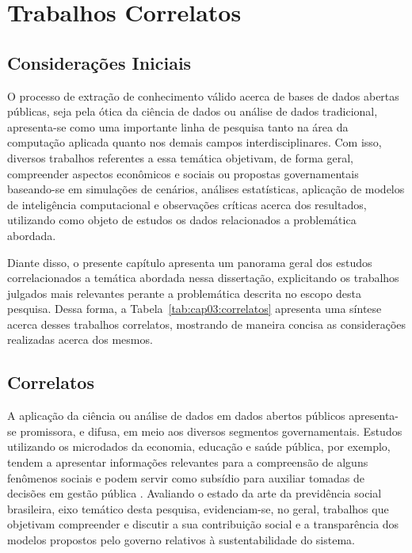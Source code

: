 \chapter{Trabalhos Correlatos}\label{cap:estArte}

\section{Considerações Iniciais}\label{sec:primTrab}

O processo de extração de conhecimento válido acerca de bases de dados abertas públicas, seja pela ótica da ciência de dados ou análise de dados tradicional, apresenta-se como uma importante linha de pesquisa tanto na área da computação aplicada quanto nos demais campos interdisciplinares. Com isso, diversos trabalhos referentes a essa temática objetivam, de forma geral, compreender aspectos econômicos e sociais ou propostas governamentais baseando-se em simulações de cenários, análises estatísticas, aplicação de modelos de inteligência computacional e observações críticas acerca dos resultados, utilizando como objeto de estudos os dados relacionados a problemática abordada. 

Diante disso, o presente capítulo apresenta um panorama geral dos estudos correlacionados a temática abordada nessa dissertação, explicitando os trabalhos julgados mais relevantes perante a problemática descrita no escopo desta pesquisa. Dessa forma, a Tabela~\ref{tab:cap03:correlatos} apresenta uma síntese acerca desses trabalhos correlatos, mostrando de maneira concisa as considerações realizadas acerca dos mesmos. 


\section{Correlatos}

A aplicação da ciência ou análise de dados em dados abertos públicos apresenta-se promissora, e difusa, em meio aos diversos segmentos governamentais. Estudos utilizando os microdados da economia, educação e saúde pública, por exemplo, tendem a apresentar informações relevantes para a compreensão de alguns fenômenos sociais e podem servir como subsídio para auxiliar tomadas de decisões em gestão pública \cite{cap03_ref1, cap03_ref2}. Avaliando o estado da arte da previdência social brasileira, eixo temático desta pesquisa, evidenciam-se, no geral, trabalhos que objetivam compreender e discutir a sua contribuição social e a transparência dos modelos propostos pelo governo relativos à sustentabilidade do sistema.

